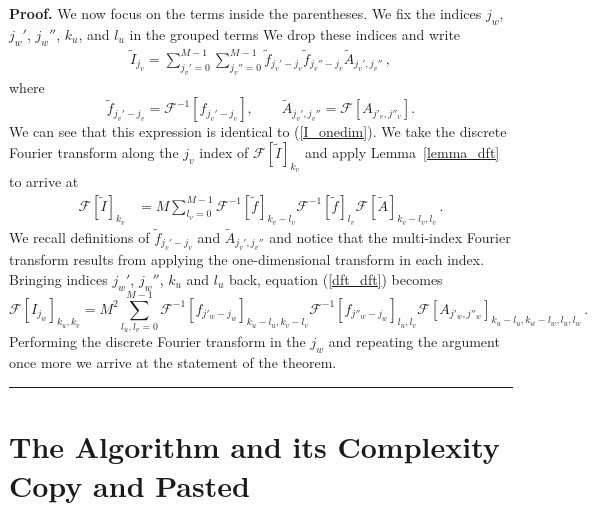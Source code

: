 \documentclass[12pt]{CSUNthesis}
\newenvironment{proof}[1][Proof]{\noindent\textbf{#1.} }{\newline \hspace*{\textwidth}\hspace*{-0,4cm} \rule{0.5em}{0.5em} \vspace{0,2cm}}
\def\calF{\mathcal{F}}
\begin{document}
\begin{proof}
We now focus on the terms inside the parentheses. We fix the indices $j_w$, $j_w'$, $j_w''$, $k_{u}$, and $l_{u}$ in the grouped terms We drop these indices and write
\begin{align*}
\tilde{I}_{j_v} =  \sum_{j_v'=0}^{M-1} \sum_{j_v''=0}^{M-1} \tilde{f}_{j_v'-j_v} \tilde{f}_{j_v''-j_v} \tilde{A}_{j_v',j_v''}\, , 
\end{align*}
where 
\begin{equation*}
\tilde{f}_{j_v'-j_v} = \calF^{-1}[f_{j_v'-j_v}],\qquad 
\tilde{A}_{j_v',j_v''} =  \calF[A_{j'_{v},j''_{v}}].
\end{equation*}
We can see that this expression is identical to (\ref{I_onedim}). We take the discrete Fourier transform along the $j_v$ index of $\calF[\tilde{I}]_{k_v}$ and apply Lemma~\ref{lemma_dft} to arrive at
\begin{align}
\label{dft_dft}
\calF[\tilde{I}]_{k_v} &= M \sum_{l_{v}=0}^{M-1} \calF^{-1}[ \tilde{f}]_{k_{v}-l_{v}} \calF^{-1}[\tilde{f}]_{l_{v}} \calF[\tilde{A}]_{k_{v}-l_{v},l_{v}}\, .
\end{align}
We recall definitions of $\tilde{f}_{j_v'-j_v}$ and $\tilde{A}_{j_v',j_v''}$ and notice that the 
multi-index  Fourier transform results from applying the one-dimensional transform in each index. 
Bringing indices
$j_w'$, $j_w''$, $k_{u}$ and $l_{u}$ back, equation (\ref{dft_dft}) becomes
\begin{equation*}
\calF[I_{j_w}]_{k_u,k_v} = M^2 \sum_{l_u,l_v=0}^{M-1} \calF^{-1}[f_{j'_w-j_w}]_{k_u-l_u,k_v-l_v} \calF^{-1}[f_{j''_w-j_w}]_{l_u,l_v} \calF[A_{j'_w,j''_w}]_{k_u-l_u,k_w-l_w,l_u,l_w}\, .
\end{equation*}
Performing the discrete Fourier transform in the $j_w$ and repeating the argument once more we arrive at the statement of the theorem.
\end{proof}

\section{The Algorithm and its Complexity Copy and Pasted}
\label{sec:algorithm}
\end{document}
